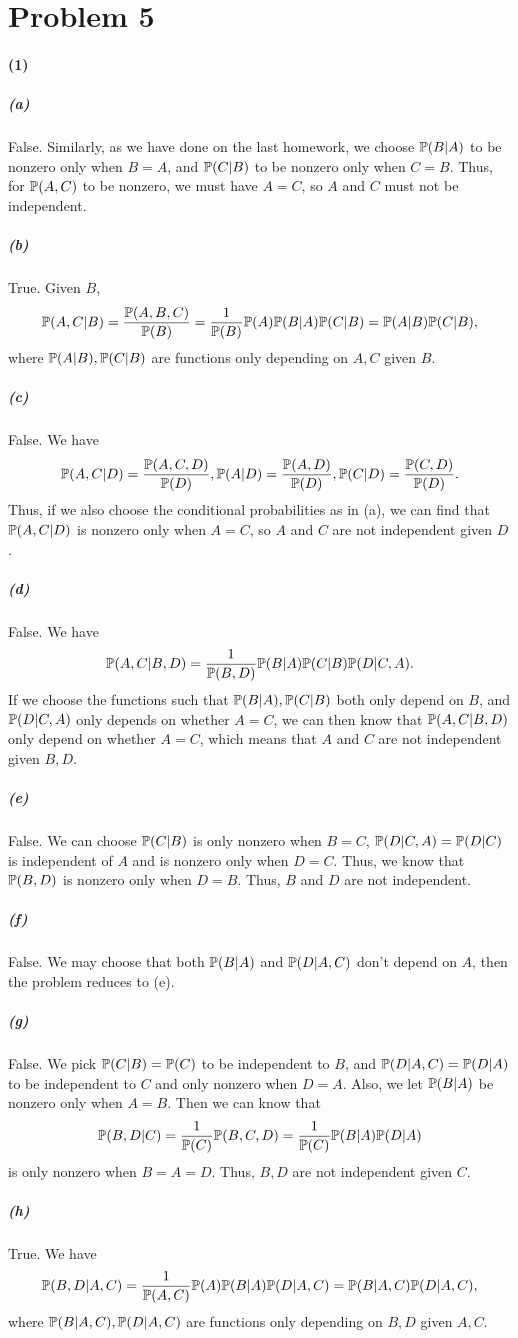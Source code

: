 \documentclass[a4 paper,12pt]{article}
\begin{document}
\section*{Problem 5}
\paragraph*{(1)}
\subparagraph*{(a)}False. Similarly, as we have done on the last homework, we choose $\mathbb{P}(B|A)$ to be nonzero only when $B=A$, and $\mathbb{P}(C|B)$ to be nonzero only when $C=B$. Thus, for $\mathbb{P}(A, C)$ to be nonzero, we must have $A=C$, so $A$ and $C$ must not be independent.

\subparagraph*{(b)}True. Given $B$,
\[
\mathbb{P}(A,C|B)=\frac{\mathbb{P}(A,B,C)}{\mathbb{P}(B)}=\frac{1}{\mathbb{P}(B)}\mathbb{P}(A)\mathbb{P}(B|A)\mathbb{P}(C|B)=\mathbb{P}(A|B)\mathbb{P}(C|B),	
\] where $\mathbb{P}(A|B),\mathbb{P}(C|B)$ are functions only depending on $A,C$ given $B$.

\subparagraph*{(c)}False. We have
\[
\mathbb{P} (A,C|D)=\frac{\mathbb{P} (A,C,D)}{\mathbb{P} (D)},\mathbb{P}(A|D)=\frac{\mathbb{P}(A,D)}{\mathbb{P}(D)},\mathbb{P}(C|D)=\frac{\mathbb{P}(C,D)}{\mathbb{P}(D)}.
\] Thus, if we also choose the conditional probabilities as in (a), we can find that $\mathbb{P}(A,C|D)$ is nonzero only when $A=C$, so $A$ and $C$ are not independent given $D$.

\subparagraph*{(d)}False. We have
\[
\mathbb{P}(A,C|B,D)=\frac{1}{\mathbb{P}(B,D)}\mathbb{P}(B|A)\mathbb{P}(C|B)\mathbb{P}(D|C,A).
\] If we choose the functions such that $\mathbb{P}(B|A),\mathbb{P}(C|B)$ both only depend on $B$, and $\mathbb{P}(D|C,A)$ only depends on whether $A=C$, we can then know that $\mathbb{P}(A,C|B,D)$ only depend on whether $A=C$, which means that $A$ and $C$ are not independent given $B,D$. 
\subparagraph*{(e)}False. We can choose $\mathbb{P}(C|B)$ is only nonzero when $B=C$, $\mathbb{P}(D|C,A)=\mathbb{P}(D|C)$ is independent of $A$ and is nonzero only when $D=C$. Thus, we know that $\mathbb{P}(B,D)$ is nonzero only when $D=B$. Thus, $B$ and $D$ are not independent.
\subparagraph*{(f)}False. We may choose that both $\mathbb{P}(B|A)$ and $\mathbb{P}(D|A,C)$ don't depend on $A$, then the problem reduces to (e).
\subparagraph*{(g)}False. We pick $\mathbb{P}(C|B)=\mathbb{P}(C)$ to be independent to $B$, and $\mathbb{P}(D|A,C)=\mathbb{P}(D|A)$ to be independent to $C$ and only nonzero when $D=A$. Also, we let $\mathbb{P}(B|A)$ be nonzero only when $A=B$. Then we can know that 
\[
\mathbb{P}(B,D|C)=\frac{1}{\mathbb{P}(C)}\mathbb{P}(B,C,D)=\frac{1}{\mathbb{P}(C)}\mathbb{P}(B|A)\mathbb{P}(D|A)	
\] is only nonzero when $B=A=D$. Thus, $B,D$ are not independent given $C$.
\subparagraph*{(h)}True. We have
\[
\mathbb{P}(B,D|A,C)=\frac{1}{\mathbb{P}(A,C)}\mathbb{P}(A)\mathbb{P}(B|A)\mathbb{P}(D|A,C)=\mathbb{P}(B|A,C)\mathbb{P}(D|A,C),
\]where $\mathbb{P}(B|A,C),\mathbb{P}(D|A,C)$ are functions only depending on $B,D$ given $A,C$.
\end{document}
